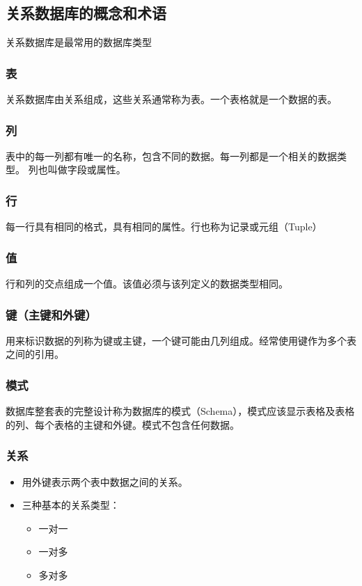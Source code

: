 \documentclass[11pt]{article}
\begin{document}
\subsection{关系数据库的概念和术语}
\label{sec:orgaab4277}
关系数据库是最常用的数据库类型
\subsubsection{表}
\label{sec:org61c6b63}
关系数据库由关系组成，这些关系通常称为表。一个表格就是一个数据的表。
\subsubsection{列}
\label{sec:org1fc40cb}
表中的每一列都有唯一的名称，包含不同的数据。每一列都是一个相关的数据类型。 列也叫做字段或属性。
\subsubsection{行}
\label{sec:org6d33112}
每一行具有相同的格式，具有相同的属性。行也称为记录或元组（Tuple）
\subsubsection{值}
\label{sec:org894ac6c}
行和列的交点组成一个值。该值必须与该列定义的数据类型相同。
\subsubsection{键（主键和外键）}
\label{sec:orgcbcde8b}
用来标识数据的列称为键或主键，一个键可能由几列组成。经常使用键作为多个表之间的引用。
\subsubsection{模式}
\label{sec:org5af28fc}
数据库整套表的完整设计称为数据库的模式（Schema），模式应该显示表格及表格的列、每个表格的主键和外键。模式不包含任何数据。
\subsubsection{关系}
\label{sec:org78a1400}
\begin{itemize}
\item 用外键表示两个表中数据之间的关系。
\item 三种基本的关系类型：
\begin{itemize}
\item 一对一
\item 一对多
\item 多对多
\end{itemize}
\end{itemize}
\end{document}
